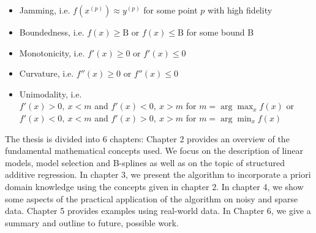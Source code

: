 \begin{itemize} \label{list:possible-constraints}
	\item Jamming, i.e. $f(x^{(p)}) \approx y^{(p)}$ for some point $p$ with high fidelity
	\item Boundedness, i.e. $f(x) \ge \mathrm{B}$ or $f(x) \le \mathrm{B}$ for some bound B
	\item Monotonicity, i.e. $f'(x) \ge 0$ or $f'(x) \le 0$
	\item Curvature, i.e. $f''(x) \ge 0$ or $f''(x) \le 0$
	\item Unimodality, i.e. \\ $f'(x) > 0, \ x < m$ and $f'(x) < 0, \ x > m$ for $m = \arg \max_{x} f(x)$ or \\ $f'(x) < 0, \ x < m$ and $f'(x) > 0, \ x > m$ for $m = \arg \min_{x} f(x)$
\end{itemize}
%
The thesis is divided into 6 chapters: Chapter 2 provides an overview of the fundamental mathematical concepts used. We focus on the description of linear models, model selection and B-splines as well as on the topic of structured additive regression. In chapter 3, we present the algorithm to incorporate a priori domain knowledge using the concepts given in chapter 2. In chapter 4, we show some aspects of the practical application of the algorithm on noisy and sparse data. Chapter 5 provides examples using real-world data. In Chapter 6, we give a summary and outline to future, possible work. 
